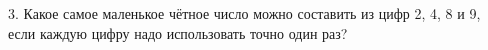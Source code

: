 3. Какое самое маленькое чётное число можно составить из цифр 2, 4, 8 и 9, если каждую цифру надо использовать точно один раз?\\
